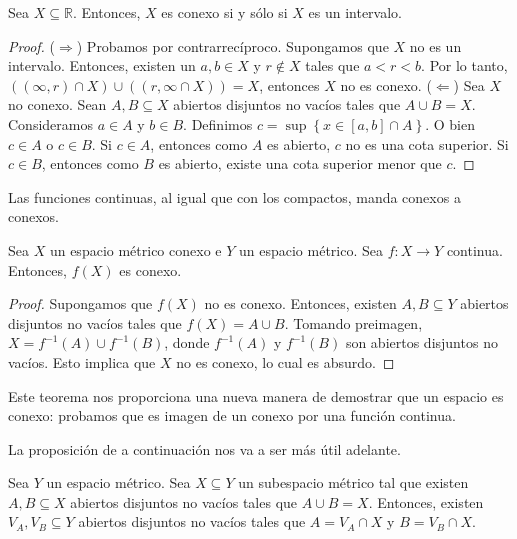 \begin{theorem}
	Sea $X \subseteq \mathbb{R}$. Entonces, $X$ es conexo si y sólo si $X$ es un intervalo.
\end{theorem}

\begin{proof}
	($\Rightarrow$) Probamos por contrarrecíproco. Supongamos que $X$ no es un intervalo. Entonces, existen un $a, b \in X$ y $r \not \in X$ tales que $a < r < b$. Por lo tanto, $((\infty, r) \cap X) \cup ((r, \infty \cap X)) = X$, entonces $X$ no es conexo.
	($\Leftarrow$) Sea $X$ no conexo. Sean $A, B \subseteq X$ abiertos disjuntos no vacíos tales que $A \cup B = X$. Consideramos $a \in A$ y $b \in B$. Definimos $c = \sup \left\{ x \in [a, b] \cap A \right\}$. O bien $c \in A$ o $c \in B$. Si $c \in A$, entonces como $A$ es abierto, $c$ no es una cota superior. Si $c \in B$, entonces como $B$ es abierto, existe una cota superior menor que $c$.
\end{proof}

Las funciones continuas, al igual que con los compactos, manda conexos a conexos.

\begin{theorem}
	Sea $X$ un espacio métrico conexo e $Y$ un espacio métrico. Sea $f : X \to Y$ continua. Entonces, $f(X)$ es conexo.
\end{theorem}

\begin{proof}
	Supongamos que $f(X)$ no es conexo. Entonces, existen $A, B \subseteq Y$ abiertos disjuntos no vacíos tales que $f(X) = A \cup B$. Tomando preimagen, $X = f^{-1}(A) \cup f^{-1}(B)$, donde $f^{-1}(A)$ y $f^{-1}(B)$ son abiertos disjuntos no vacíos. Esto implica que $X$ no es conexo, lo cual es absurdo.
\end{proof}

Este teorema nos proporciona una nueva manera de demostrar que un espacio es conexo: probamos que es imagen de un conexo por una función continua.

La proposición de a continuación nos va a ser más útil adelante.

\begin{proposition}
	Sea $Y$ un espacio métrico. Sea $X \subseteq Y$ un subespacio métrico tal que existen $A, B \subseteq X$ abiertos disjuntos no vacíos tales que $A \cup B = X$. Entonces, existen $V_{A}, V_B \subseteq Y$ abiertos disjuntos no vacíos tales que $A = V_A \cap X$ y $B = V_B \cap X$.
\end{proposition}

